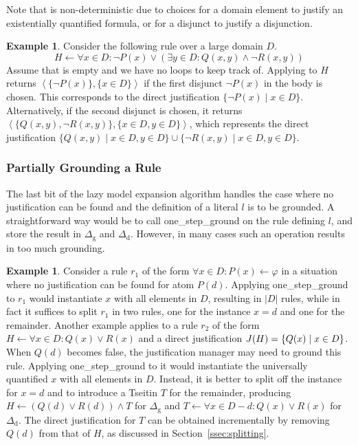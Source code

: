 \documentclass[11pt]{article}
\newcommand{\m}[1]{\ensuremath{#1}\xspace}
\newcommand{\lrule}{\m{\leftarrow}}
\newcommand{\D}{\m{\Delta}}
\newcommand{\f}{\m{\varphi}}
\newcommand{\typed}[2]{\m{#1\in #2:}}
\newcommand{\tuple}[1]{\m{\left \langle #1 \right \rangle }}
\theoremstyle{plain}
\theoremstyle{definition}
\theoremstyle{example_basic}
\newtheorem{example}[thm]{Example}
\theoremstyle{example_contd}
\theoremstyle{plain}
\newcommand{\groundone}{\textsf{one\_step\_ground}\xspace}
\newcommand{\Dg}{\ensuremath{\D_\text{g}}\xspace}
\newcommand{\Dd}{\ensuremath{\D_\text{d}}\xspace}
\newcommand{\change}[1]{#1}
\begin{document}
\change{Note that \buildconstr is non-deterministic due to choices for a domain element to justify an existentially quantified formula, or for a disjunct to justify a disjunction.} 

\begin{example}\label{ex:build}
Consider the following rule over a large domain $D$. \[H \lrule \forall \typed{x}{D} \lnot P(x) \lor (\exists \typed{y}{D} Q(x,y) \land \lnot R(x,y))\] Assume that \jgraph is empty and we have no loops to keep track of. \change{Applying \buildconstr to $H$ returns $\tuple{\{\lnot P(x)\},\{x\in D\}}$ if the first disjunct $\lnot P(x)$ in the body is chosen. This corresponds to the direct justification $\{\lnot P(x) \mid x\in D\}$. Alternatively, if the second disjunct is chosen, it returns $\tuple{\{Q(x,y), \lnot R(x,y)\},\{x\in D, y\in D\}}$, which represents the direct justification $\{Q(x,y) \mid x\in D, y \in D\} \cup \{\lnot R(x,y) \mid x\in D, y \in D\}$.  }
\end{example}


\subsubsection{Partially Grounding a Rule}\label{sec:splitandground}
The last bit of the lazy model expansion algorithm handles the case where no justification can be found and the definition of  a literal $l$ is to be grounded.   A straightforward way  would be to call \groundone on the  rule defining $l$, and store  the result in \Dg and \Dd. 
However, in many cases such an operation results in too much grounding. 
\begin{example}\label{ex:splitting}
Consider a rule $r_1$ of the form $\forall x\in D: P(x) \lrule \f$ in a situation where no justification can be found for atom $P(d)$. Applying \groundone to $r_1$ would instantiate $x$ with all elements in $D$, resulting in $|D|$ rules, while in fact it  suffices to split $r_1$ in two rules, one for the instance $x=d$ and one for the remainder. \change{Another example applies to a rule $r_2$ of the form $H \lrule \forall x \in D: Q(x) \lor R(x)$ and a direct justification $J(H)=\{Q(x) \mid x\in D\}$. When $Q(d)$ becomes false, the justification manager may need to ground this rule. Applying \groundone to it would instantiate the universally quantified $x$ with all elements in $D$. Instead, it is better  to  split off the instance for $x=d$ and to  introduce a Tseitin $T$ for the remainder, producing $H\lrule (Q(d)\lor R(d)) \land T$ for \Dg and $T\lrule \forall x\in D-d: Q(x) \lor R(x)$ for \Dd. The direct justification for $T$ can be obtained  incrementally by removing $Q(d)$ from that of $H$, as discussed in Section~\ref{ssec:splitting}.}
\end{example}
\end{document}
